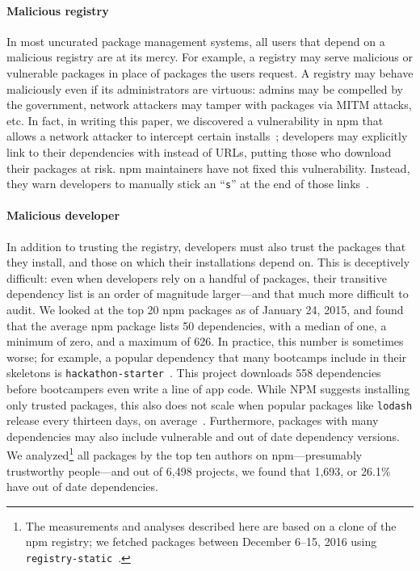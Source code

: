 \paragraph{Malicious registry}
In most uncurated package management systems, all users that depend on a
malicious registry are at its mercy. For example, a registry may
serve malicious or vulnerable packages in place of 
packages the users request. A registry may behave maliciously
even if its administrators are virtuous: admins may be
compelled by the government, network attackers may tamper with
packages via MITM attacks, etc. In fact, in writing this paper, we discovered a
vulnerability in npm that allows a network attacker to intercept
certain installs~\cite{shrink}; developers may explicitly link to their dependencies with
\http instead of \https URLs, putting those who
download their packages at risk. npm maintainers have
not fixed this vulnerability. Instead, they warn developers to manually
stick an ``\texttt{s}'' at the end of those links~\cite{shrink-response}.

\paragraph{Malicious developer} %
In addition to trusting the registry, developers must also trust the packages
that they install, and those on which their installations depend on. This is
deceptively difficult: even when developers rely on a handful of packages,
their transitive dependency list is an order of magnitude larger---and that
much more difficult to audit. 
We looked at the top 20 npm packages as of January 24, 2015, and found that
the average npm package lists 50 dependencies, with a median of one, a minimum
of zero, and a maximum of 626. 
In practice, this number is sometimes worse; for example, a popular dependency
that many bootcamps include in their skeletons is
\texttt{hackathon-starter}~\cite{hackathon-starter}.
This project downloads 558 dependencies before bootcampers even write a line of app
code.
While NPM suggests installing only trusted packages, this also does not scale
when popular packages like \texttt{lodash} release every thirteen
days, on average~\cite{npm-package-install, staicu2016understanding}.
Furthermore, packages with many dependencies may also include vulnerable
and out of date dependency versions. We analyzed\footnote{
  The measurements and analyses described here are based on a clone of
  the npm registry; we fetched packages between December 6--15, 2016 using
  \texttt{registry-static}~\cite{registry-static}.} all packages by the top ten
authors on npm---presumably trustworthy people---and out of 6,498 projects,
we found that 1,693, or 26.1\% have out of date dependencies.

